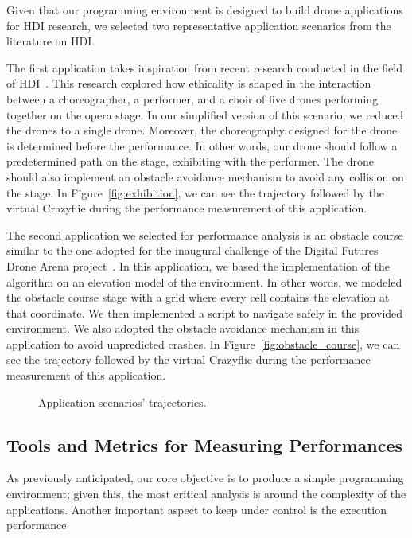 Given that our programming environment is designed to build drone applications for HDI research, we selected two representative application scenarios from the literature on HDI.

The first application takes inspiration from recent research conducted in the field of HDI~\cite{eriksson2020ethicsInMovement}. 
This research explored how ethicality is shaped in the interaction between a choreographer, a performer, and a choir of five drones performing together on the opera stage.
In our simplified version of this scenario, we reduced the drones to a single drone. 
Moreover, the choreography designed for the drone is determined before the performance.
In other words, our drone should follow a predetermined path on the stage, exhibiting with the performer. 
The drone should also implement an obstacle avoidance mechanism to avoid any collision on the stage.
In Figure~\ref{fig:exhibition}, we can see the trajectory followed by the virtual Crazyflie during the performance measurement of this application.

The second application we selected for performance analysis is an obstacle course similar to the one adopted for the inaugural challenge of the Digital Futures Drone Arena project~\cite{dronearenaChallenge}.
In this application, we based the implementation of the algorithm on an elevation model of the environment. 
In other words, we modeled the obstacle course stage with a grid where every cell contains the elevation at that coordinate.
We then implemented a script to navigate safely in the provided environment. 
We also adopted the obstacle avoidance mechanism in this application to avoid unpredicted crashes.
In Figure~\ref{fig:obstacle_course}, we can see the trajectory followed by the virtual Crazyflie during the performance measurement of this application.

\begin{figure}[tb]
    \centering
    \quad
    \caption{Application scenarios' trajectories.}\label{fig:application_traj}
\end{figure}

\subsection{Tools and Metrics for Measuring Performances}\label{subsec:performance_metrics}
As previously anticipated, our core objective is to produce a simple programming environment; given this, the most critical analysis is around the complexity of the applications.
Another important aspect to keep under control is the execution performance 

